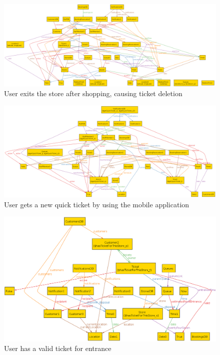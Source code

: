 \begin{figure} [H]
	\includegraphics[width=\linewidth]{../Alloy/exitStore.png}
	\caption{User exits the store after shopping, causing ticket deletion}
	\label{fig:alloyExitStore}
\end{figure}

\begin{figure} [H]
	\includegraphics[width=\linewidth]{../Alloy/getQuickTicket.png}
	\caption{User gets a new quick ticket by using the mobile application}
	\label{fig:exitStore}
\end{figure}

\begin{figure} [H]
	\includegraphics[width=\linewidth]{../Alloy/hasTicketForThisStore.png}
	\caption{User has a valid ticket for entrance}
	\label{fig:hasTicketForThisStore}
\end{figure}

